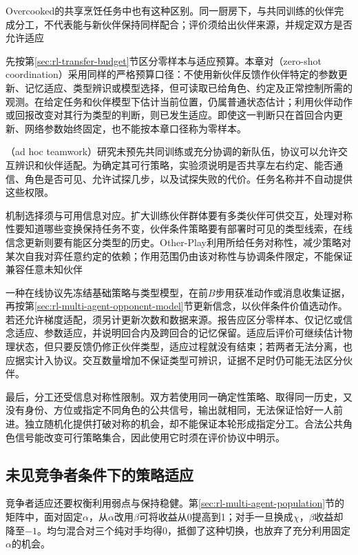 Overcooked的共享烹饪任务中也有这种区别。同一厨房下，与共同训练的伙伴完成分工，不代表能与新伙伴保持同样配合；评价须给出伙伴来源，并规定双方是否允许适应

先按第\ref{sec:rl-transfer-budget}节区分零样本与适应预算。本章对（zero-shot coordination）采用同样的严格预算口径：不使用新伙伴反馈作伙伴特定的参数更新、记忆适应、类型辨识或模型选择，但可读取已给角色、约定及正常控制所需的观测。在给定任务和伙伴模型下估计当前位置，仍属普通状态估计；利用伙伴动作或回报改变对其行为类型的判断，则已发生适应。即使这一判断只在首回合内更新、网络参数始终固定，也不能按本章口径称为零样本。

（ad hoc teamwork）研究未预先共同训练或充分协调的新队伍，协议可以允许交互辨识和伙伴适配。为确定其可行策略，实验须说明是否共享左右约定、能否通信、角色是否可见、允许试探几步，以及试探失败的代价。任务名称并不自动提供这些权限。

机制选择须与可用信息对应。扩大训练伙伴群体要有多类伙伴可供交互，处理对称性要知道哪些变换保持任务不变，伙伴条件策略要有部署时可见的类型线索，在线信念更新则要有能区分类型的历史。Other-Play利用所给任务对称性，减少策略对某次自我对弈任意约定的依赖；作用范围仍由该对称性与协调条件限定，不能保证兼容任意未知伙伴

一种在线协议先冻结基础策略与类型模型，在前$B$步用获准动作或消息收集证据，再按第\ref{sec:rl-multi-agent-opponent-model}节更新信念，以伙伴条件价值选动作。若还允许梯度适配，须另计更新次数和数据来源。报告应区分零样本、仅记忆或信念适应、参数适应，并说明回合内及跨回合的记忆保留。适应后评价可继续估计物理状态，但只要反馈仍修正伙伴类型，适应过程就没有结束；若两者无法分离，也应据实计入协议。交互数量增加不保证类型可辨识，证据不足时仍可能无法区分伙伴。

最后，分工还受信息对称性限制。双方若使用同一确定性策略、取得同一历史，又没有身份、方位或指定不同角色的公共信号，输出就相同，无法保证恰好一人前进。独立随机化提供打破对称的机会，却不能保证本轮形成指定分工。合法公共角色信号能改变可行策略集合，因此使用它时须在评价协议中明示。

\subsection{未见竞争者条件下的策略适应}
\label{sec:rl-multi-agent-new-opponents}

竞争者适应还要权衡利用弱点与保持稳健。第\ref{sec:rl-multi-agent-population}节的矩阵中，面对固定$\alpha$，从$\alpha$改用$\beta$可将收益从0提高到1；对手一旦换成$\chi$，$\beta$收益却降至$-1$。均匀混合对三个纯对手均得0，抵御了这种切换，也放弃了充分利用固定$\alpha$的机会。

